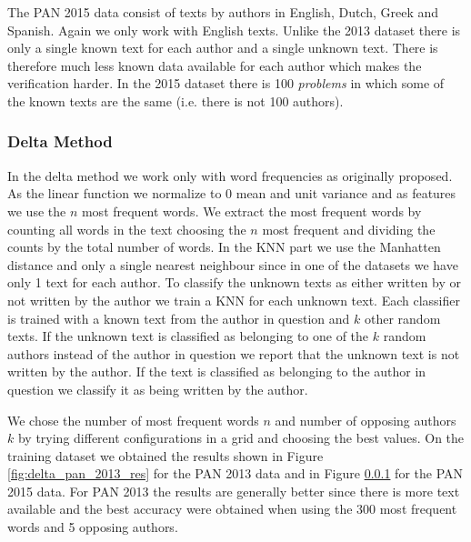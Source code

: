 The PAN 2015 data consist of texts by authors in English, Dutch, Greek and
Spanish. Again we only work with English texts. Unlike the 2013 dataset there is
only a single known text for each author and a single unknown text. There is
therefore much less known data available for each author which makes the
verification harder. In the 2015 dataset there is 100 \textit{problems} in which
some of the known texts are the same (i.e. there is not 100 authors).

\subsubsection{Delta Method}
In the delta method we work only with word frequencies as originally proposed.
As the linear function we normalize to 0 mean and unit variance and as features
we use the $n$ most frequent words. We extract the most frequent words by
counting all words in the text choosing the $n$ most frequent and dividing the
counts by the total number of words. In the \gls{KNN} part we use the Manhatten
distance and only a single nearest neighbour since in one of the datasets we
have only 1 text for each author. To classify the unknown texts as either
written by or not written by the author we train a \gls{KNN} for each unknown
text.  Each classifier is trained with a known text from the author in question
and $k$ other random texts. If the unknown text is classified as belonging
to one of the $k$ random authors instead of the author in question we report
that the unknown text is not written by the author. If the text is classified
as belonging to the author in question we classify it as being written by the
author.

We chose the number of most frequent words $n$ and number of opposing authors
$k$ by trying different configurations in a grid and choosing the best
values. On the training dataset we obtained the results shown in Figure
\ref{fig:delta_pan_2013_res} for the PAN 2013 data and in Figure \ref{} for the
PAN 2015 data. For PAN 2013 the results are generally better since there is more
text available and the best accuracy were obtained when using the 300 most
frequent words and 5 opposing authors.

